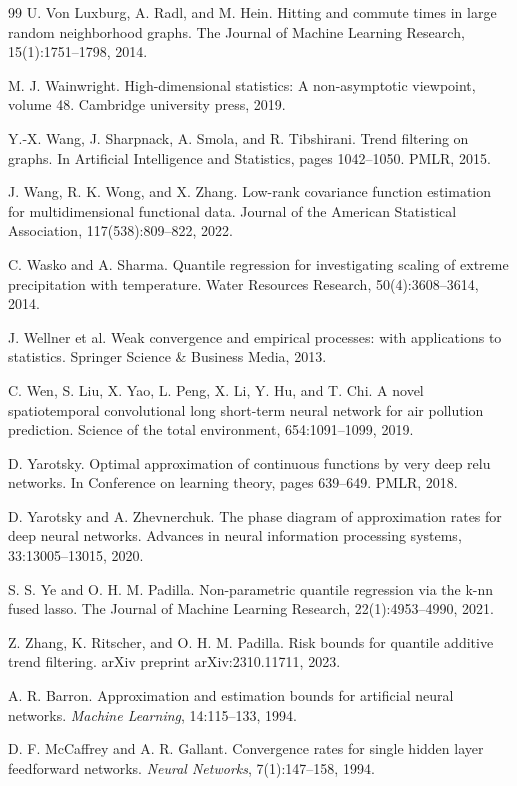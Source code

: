 \documentclass[twoside,11pt]{article}
\begin{document}
\begin{thebibliography}{99}
 U. Von Luxburg, A. Radl, and M. Hein. Hitting and commute times in large random neighborhood graphs. The Journal of Machine Learning Research, 15(1):1751--1798, 2014.

 M. J. Wainwright. High-dimensional statistics: A non-asymptotic viewpoint, volume 48. Cambridge university press, 2019.

 Y.-X. Wang, J. Sharpnack, A. Smola, and R. Tibshirani. Trend filtering on graphs. In Artificial Intelligence and Statistics, pages 1042--1050. PMLR, 2015.

 J. Wang, R. K. Wong, and X. Zhang. Low-rank covariance function estimation for multidimensional functional data. Journal of the American Statistical Association, 117(538):809--822, 2022.

 C. Wasko and A. Sharma. Quantile regression for investigating scaling of extreme precipitation with temperature. Water Resources Research, 50(4):3608--3614, 2014.

 J. Wellner et al. Weak convergence and empirical processes: with applications to statistics. Springer Science \& Business Media, 2013.

 C. Wen, S. Liu, X. Yao, L. Peng, X. Li, Y. Hu, and T. Chi. A novel spatiotemporal convolutional long short-term neural network for air pollution prediction. Science of the total environment, 654:1091--1099, 2019.

 D. Yarotsky. Optimal approximation of continuous functions by very deep relu networks. In Conference on learning theory, pages 639--649. PMLR, 2018.

 D. Yarotsky and A. Zhevnerchuk. The phase diagram of approximation rates for deep neural networks. Advances in neural information processing systems, 33:13005--13015, 2020.

 S. S. Ye and O. H. M. Padilla. Non-parametric quantile regression via the k-nn fused lasso. The Journal of Machine Learning Research, 22(1):4953--4990, 2021.

 Z. Zhang, K. Ritscher, and O. H. M. Padilla. Risk bounds for quantile additive trend filtering. arXiv preprint arXiv:2310.11711, 2023.

A. R. Barron. Approximation and estimation bounds for artificial neural networks.
\emph{Machine Learning}, 14:115--133, 1994.

D. F. McCaffrey and A. R. Gallant. Convergence rates for single hidden layer
feedforward networks. \emph{Neural Networks}, 7(1):147--158, 1994.
\end{thebibliography}
\end{document}
